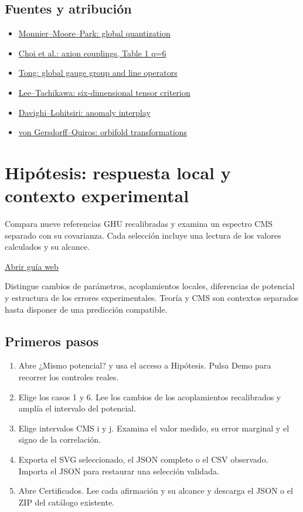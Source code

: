 \documentclass[11pt,a4paper]{article}
\begin{document}
\subsection*{Fuentes y atribución}
\begin{itemize}
\item \href{https://arxiv.org/abs/1711.04777}{Monnier--Moore--Park: global quantization}
\item \href{https://arxiv.org/abs/2309.03937}{Choi et al.: axion couplings, Table 1 q=6}
\item \href{https://arxiv.org/abs/1705.01853}{Tong: global gauge group and line operators}
\item \href{https://arxiv.org/abs/2012.11622}{Lee--Tachikawa: six-dimensional tensor criterion}
\item \href{https://arxiv.org/abs/2011.10102}{Davighi--Lohitsiri: anomaly interplay}
\item \href{https://arxiv.org/abs/hep-th/0305024}{von Gersdorff--Quiros: orbifold transformations}
\end{itemize}
\section{Hipótesis: respuesta local y contexto experimental}
Compara nueve referencias GHU recalibradas y examina un espectro CMS separado con su covarianza. Cada selección incluye una lectura de los valores calculados y su alcance.

\href{https://karlesmarin.github.io/ghu-explorer/guide/es/hypothesiscompare/index.html}{Abrir guía web}

Distingue cambios de parámetros, acoplamientos locales, diferencias de potencial y estructura de los errores experimentales. Teoría y CMS son contextos separados hasta disponer de una predicción compatible.
\subsection*{Primeros pasos}
\begin{enumerate}
\item Abre ¿Mismo potencial? y usa el acceso a Hipótesis. Pulsa Demo para recorrer los controles reales.
\item Elige los casos 1 y 6. Lee los cambios de los acoplamientos recalibrados y amplía el intervalo del potencial.
\item Elige intervalos CMS i y j. Examina el valor medido, su error marginal y el signo de la correlación.
\item Exporta el SVG seleccionado, el JSON completo o el CSV observado. Importa el JSON para restaurar una selección validada.
\item Abre Certificados. Lee cada afirmación y su alcance y descarga el JSON o el ZIP del catálogo existente.
\end{enumerate}
\end{document}

